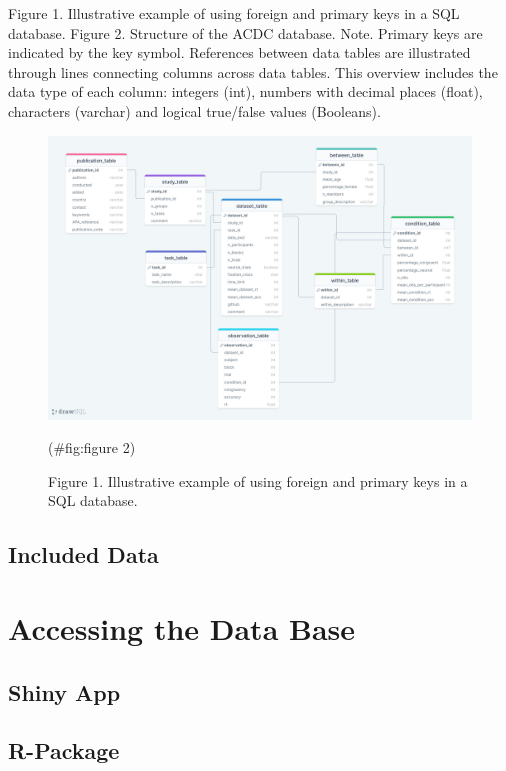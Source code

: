 \documentclass[
  man]{apa6}
\begin{document}
Figure 1. Illustrative example of using foreign and primary keys in a SQL database. Figure 2. Structure of the ACDC database. Note. Primary keys are indicated by the key symbol. References between data tables are illustrated through lines connecting columns across data tables. This overview includes the data type of each column: integers (int), numbers with decimal places (float), characters (varchar) and logical true/false values (Booleans).

\begin{figure}
\includegraphics[width=10.87in]{images/db_structure} \caption{Figure 1. Illustrative example of using foreign and primary keys in a SQL database.}(\#fig:figure 2)
\end{figure}

\hypertarget{included-data}{%
\subsection{Included Data}\label{included-data}}

\hypertarget{accessing-the-data-base}{%
\section{Accessing the Data Base}\label{accessing-the-data-base}}

\hypertarget{shiny-app}{%
\subsection{Shiny App}\label{shiny-app}}

\hypertarget{r-package}{%
\subsection{R-Package}\label{r-package}}
\end{document}
